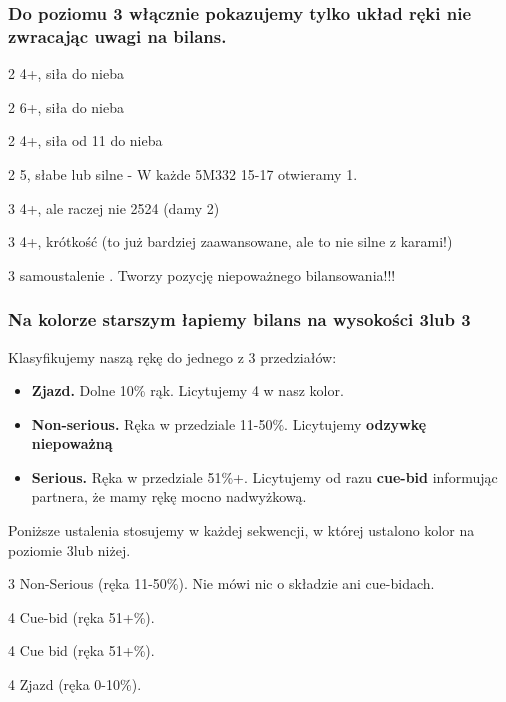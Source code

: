 \documentclass[12pt, a4paper]{article}
\begin{document}
\subsubsection*{Do poziomu 3 włącznie pokazujemy tylko układ ręki nie zwracając uwagi na bilans.}

\sequence{{1\hearts}{2\clubs}}
\begin{options}[1]
	\item[2\diams] 4+\diams, siła do nieba
	\item[2\hearts] 6+\hearts, siła do nieba
	\item[2\spades] 4+\spades, siła od 11 do nieba
	\item[2\nt] 5, słabe lub silne - W każde 5M332 15-17 otwieramy 1\nt.
	\item[3\clubs] 4+\clubs, ale raczej nie 2524 (damy 2\nt)
	\br
	\item[3\diams] 4+\clubs, krótkość \diams (to już bardziej zaawansowane, ale to nie silne z karami!)
	\item[3\hearts] samoustalenie \hearts. Tworzy pozycję niepoważnego bilansowania!!!
\end{options}


\subsubsection*{Na kolorze starszym łapiemy bilans na wysokości 3\spades lub 3\nt}

Klasyfikujemy naszą rękę do jednego z 3 przedziałów:
\begin{itemize}
	\item \textbf{Zjazd.} Dolne 10\% rąk. Licytujemy 4 w nasz kolor.
	\item \textbf{Non-serious.} Ręka w przedziale 11-50\%. Licytujemy \textbf{odzywkę niepoważną}
	\item \textbf{Serious.} Ręka w przedziale 51\%+. Licytujemy od razu \textbf{cue-bid} informując partnera, że mamy rękę mocno nadwyżkową.
\end{itemize}


Poniższe ustalenia stosujemy w każdej sekwencji, w której ustalono kolor na poziomie 3\major lub niżej.
\sequence{{1\spades}{2\clubs}{2\spades}{3\spades}}
\begin{options}[1]
	\item[3\nt] Non-Serious (ręka 11-50\%). Nie mówi nic o składzie ani cue-bidach. \imp
	\item[4\clubs] Cue-bid (ręka 51+\%).
	\item[4\diams] Cue bid (ręka 51+\%).
	\item[4\spades] Zjazd (ręka 0-10\%).
\end{options}
\end{document}
